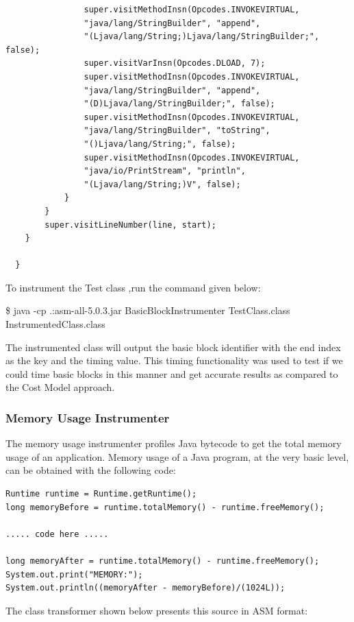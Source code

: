 \documentclass[11pt]{article}
\begin{document}
\begin{lstlisting}
                super.visitMethodInsn(Opcodes.INVOKEVIRTUAL, 
                "java/lang/StringBuilder", "append", 
                "(Ljava/lang/String;)Ljava/lang/StringBuilder;", false);
                super.visitVarInsn(Opcodes.DLOAD, 7);
                super.visitMethodInsn(Opcodes.INVOKEVIRTUAL, 
                "java/lang/StringBuilder", "append", 	
                "(D)Ljava/lang/StringBuilder;", false);
                super.visitMethodInsn(Opcodes.INVOKEVIRTUAL, 
                "java/lang/StringBuilder", "toString", 
                "()Ljava/lang/String;", false);
                super.visitMethodInsn(Opcodes.INVOKEVIRTUAL, 
                "java/io/PrintStream", "println", 
                "(Ljava/lang/String;)V", false);
            }
        }
        super.visitLineNumber(line, start);
    }

  }
\end{lstlisting}

To instrument the Test class ,run the command given below:

\$ java -cp .:asm-all-5.0.3.jar BasicBlockInstrumenter TestClass.class InstrumentedClass.class

The instrumented class will output the basic block identifier with the end index as the key and the timing value. This timing functionality was used to test if we could time basic blocks in this manner and get accurate results as compared to the Cost Model approach.

\subsubsection{Memory Usage Instrumenter}
The memory usage instrumenter profiles Java bytecode to get the total memory usage of an application. Memory usage of a Java program, at the very basic level, can be obtained with the following code:
\begin{lstlisting}
Runtime runtime = Runtime.getRuntime();
long memoryBefore = runtime.totalMemory() - runtime.freeMemory();

..... code here .....

long memoryAfter = runtime.totalMemory() - runtime.freeMemory();
System.out.print("MEMORY:");
System.out.println((memoryAfter - memoryBefore)/(1024L));
\end{lstlisting}

The class transformer shown below presents this source in ASM format:
\end{document}
